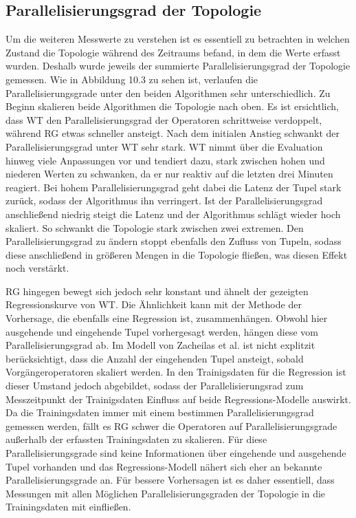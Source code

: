 \subsection{Parallelisierungsgrad der Topologie}
Um die weiteren Messwerte zu verstehen ist es essentiell zu betrachten in welchen Zustand die Topologie während des Zeitraums befand, in dem die Werte erfasst wurden.
Deshalb wurde jeweils der summierte Parallelisierungsgrad der Topologie gemessen.
Wie in Abbildung 10.3 zu sehen ist, verlaufen die Parallelisierungsgrade unter den beiden Algorithmen sehr unterschiedlich.
Zu Beginn skalieren beide Algorithmen die Topologie nach oben. Es ist ersichtlich, dass WT den Parallelisierungsgrad der Operatoren schrittweise verdoppelt, während RG etwas schneller ansteigt.
Nach dem initialen Anstieg schwankt der Parallelisierungsgrad unter WT sehr stark.
WT nimmt über die Evaluation hinweg viele Anpassungen vor und tendiert dazu, stark zwischen hohen und niederen Werten zu schwanken, da er nur reaktiv auf die letzten drei Minuten reagiert.
Bei hohem Parallelisierungsgrad geht dabei die Latenz der Tupel stark zurück, sodass der Algorithmus ihn verringert.
Ist der Parallelisierungsgrad anschließend niedrig steigt die Latenz und der Algorithmus schlägt wieder hoch skaliert.
So schwankt die Topologie stark zwischen zwei extremen.
Den Parallelisierungsgrad zu ändern stoppt ebenfalls den Zufluss von Tupeln, sodass diese anschließend in größeren Mengen in die Topologie fließen, was diesen Effekt noch verstärkt.

RG hingegen bewegt sich jedoch sehr konstant und ähnelt der gezeigten Regressionskurve von WT.
Die Ähnlichkeit kann mit der Methode der Vorhersage, die ebenfalls eine Regression ist, zusammenhängen. Obwohl hier ausgehende und eingehende Tupel vorhergesagt werden, hängen diese vom Parallelisierungsgrad ab.
Im Modell von Zacheilas et al. ist nicht explitzit berücksichtigt, dass die Anzahl der eingehenden Tupel ansteigt, sobald Vorgängeroperatoren skaliert werden.
In den Trainigsdaten für die Regression ist dieser Umstand jedoch abgebildet, sodass der Parallelisierungsrad zum Messzeitpunkt der Trainigsdaten Einfluss auf beide Regressions-Modelle auswirkt.
Da die Trainingsdaten immer mit einem bestimmen Parallelisierungsgrad gemessen werden, fällt es RG schwer die Operatoren auf Parallelisierungsgrade außerhalb der erfassten Trainingsdaten zu skalieren.
Für diese Parallelisierungsgrade sind keine Informationen über eingehende und ausgehende Tupel vorhanden und das Regressions-Modell nähert sich eher an bekannte Parallelisierungsgrade an.
Für bessere Vorhersagen ist es daher essentiell, dass Messungen mit allen Möglichen Parallelisierungsgraden der Topologie in die Trainingsdaten mit einfließen.

